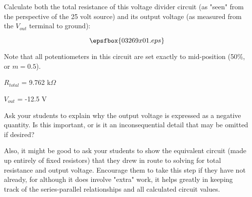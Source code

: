 

Calculate both the total resistance of this voltage divider circuit (as "seen" from the perspective of the 25 volt source) and its output voltage (as measured from the $V_{out}$ terminal to ground): 

$$\epsfbox{03269x01.eps}$$

Note that all potentiometers in this circuit are set exactly to mid-position (50\%, or $m = 0.5$).







$R_{total}$ = 9.762 k$\Omega$

\vskip 10pt

$V_{out}$ = -12.5 V







Ask your students to explain why the output voltage is expressed as a negative quantity.  Is this important, or is it an inconsequential detail that may be omitted if desired?

Also, it might be good to ask your students to show the equivalent circuit (made up entirely of fixed resistors) that they drew in route to solving for total resistance and output voltage.  Encourage them to take this step if they have not already, for although it does involve "extra" work, it helps greatly in keeping track of the series-parallel relationships and all calculated circuit values.




